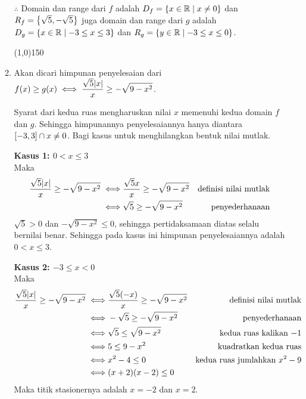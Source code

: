\begin{enumerate}[leftmargin=*, label={\arabic*}.]
\begin{enumerate}[label={\alph*}.]
    $\therefore$ Domain dan range dari $f$ adalah $D_f=\set*{x\in \mathbb{R} \mid x\neq 0}$ dan 
    $R_f=\set*{\sqrt{5},-\sqrt{5}}$ juga domain dan range dari $g$ adalah 
    $D_g=\set*{x\in \mathbb{R} \mid -3 \leq x \leq 3}$ dan 
    $R_g=\set*{y\in \mathbb{R} \mid -3 \leq x \leq 0}$.


\begin{center}\line(1,0){150}\end{center}


    \item Akan dicari himpunan penyelesaian dari $\ds f(x) \geq g(x) 
    \iff \frac{\sqrt{5}\abs{x}}{x} \geq -\sqrt{9-x^{2}}$.

    Syarat dari kedua ruas mengharuskan nilai $x$ memenuhi kedua domain $f$ dan $g$. 
    Sehingga himpunannya penyelesaiannya hanya diantara $\cic{-3,3} \cap x \neq 0$.
    Bagi kasus untuk menghilangkan bentuk nilai mutlak.

    \textbf{Kasus 1: $0 < x \leq 3$}\\
    Maka
    \begin{align*}
        \frac{\sqrt{5}\abs{x}}{x} \geq -\sqrt{9-x^{2}}
        \iff &\frac{\sqrt{5}x}{x} \geq -\sqrt{9-x^{2}} 
        &\text{definisi nilai mutlak} \\
        \iff &\sqrt{5} \geq -\sqrt{9-x^{2}}
        &\text{penyederhanaan}
    \end{align*}
    $\sqrt{5}>0$ dan $-\sqrt{9-x^{2}} \leq 0$, sehingga pertidaksamaan diatas selalu 
    bernilai benar. Sehingga pada kasus ini himpunan penyelesaiannya adalah $0 < x \leq 3$.

    \textbf{Kasus 2: $-3 \leq x < 0$}\\
    Maka
    \begin{align*}
        \frac{\sqrt{5}\abs{x}}{x} \geq -\sqrt{9-x^{2}}
        \iff &\frac{\sqrt{5}(-x)}{x} \geq -\sqrt{9-x^{2}} 
        &\text{definisi nilai mutlak} \\
        \iff &-\sqrt{5} \geq -\sqrt{9-x^{2}}
        &\text{penyederhanaan}\\
        \iff &\sqrt{5} \leq \sqrt{9-x^{2}}
        &\text{kedua ruas kalikan $-1$}\\
        \iff & 5 \leq 9-x^{2}
        &\text{kuadratkan kedua ruas}\\
        \iff &x^{2}-4 \leq 0
        &\text{kedua ruas jumlahkan $x^{2}-9$}\\
        \iff &(x+2)(x-2) \leq 0
    \end{align*}
    Maka titik stasionernya adalah $x=-2$ dan $x=2$.


\end{enumerate}
\end{enumerate}
